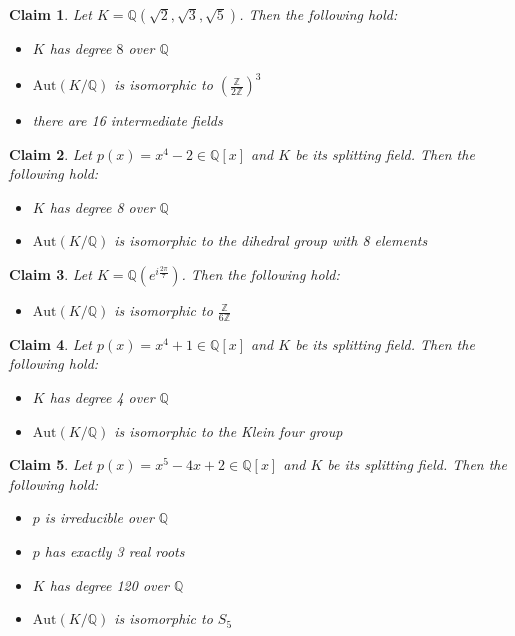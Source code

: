 \documentclass{article}
\newtheorem{claim}{Claim}
\begin{document}
\begin{claim}
  Let $K=\mathbb{Q}(\sqrt{2},\sqrt{3},\sqrt{5})$. Then the following hold:
  \begin{itemize}
    \item $K$ has degree $8$ over $\mathbb{Q}$
    \item $\text{Aut}(K/\mathbb{Q})$ is isomorphic to $(\frac{\mathbb{Z}}{2\mathbb{Z}})^3$
    \item there are 16 intermediate fields
  \end{itemize}
\end{claim}

\begin{claim}
  Let $p(x)=x^4-2 \in \mathbb{Q}[x]$ and $K$ be its splitting field. Then the following hold:
  \begin{itemize}
    \item $K$ has degree 8 over $\mathbb{Q}$
    \item $\text{Aut}(K/\mathbb{Q})$ is isomorphic to the dihedral group with 8 elements
  \end{itemize}
\end{claim}

\begin{claim}
  Let $K=\mathbb{Q}(e^{i\frac{2\pi}{7}})$. Then the following hold:
  \begin{itemize}
    \item $\text{Aut}(K/\mathbb{Q})$ is isomorphic to $\frac{\mathbb{Z}}{6\mathbb{Z}}$
  \end{itemize}
\end{claim}

\begin{claim}
  Let $p(x)=x^4+1 \in \mathbb{Q}[x]$ and $K$ be its splitting field. Then the following hold:
  \begin{itemize}
    \item $K$ has degree 4 over $\mathbb{Q}$
    \item $\text{Aut}(K/\mathbb{Q})$ is isomorphic to the Klein four group
  \end{itemize}
\end{claim}

\begin{claim}
  Let $p(x)=x^5-4x+2 \in \mathbb{Q}[x]$ and $K$ be its splitting field. Then the following hold:
  \begin{itemize}
    \item $p$ is irreducible over $\mathbb{Q}$
    \item $p$ has exactly 3 real roots
    \item $K$ has degree 120 over $\mathbb{Q}$
    \item $\text{Aut}(K/\mathbb{Q})$ is isomorphic to $S_5$
  \end{itemize}
\end{claim}
\end{document}
